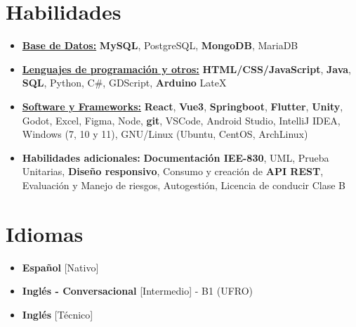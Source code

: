 \documentclass[11pt,a4paper,sans]{moderncv}
\newcommand{\sectionMargin}{-3mm}
\begin{document}
\section{Habilidades}{
    \begin{itemize}[label=\textbullet]
        \item {\underline{\textbf{Base de Datos:}}
            \textbf{MySQL},
            PostgreSQL,
            \textbf{MongoDB},
            MariaDB
        }
        \item {\underline{\textbf{Lenguajes de programación y otros:}}
            \textbf{HTML/CSS/JavaScript},
            \textbf{Java},
            \textbf{SQL},
            Python,
            C\#,
            GDScript,
            \textbf{Arduino}
            LateX
        }
        \item {\underline{\textbf{Software y Frameworks:}}
            \textbf{React},
            \textbf{Vue3},
            \textbf{Springboot},
            \textbf{Flutter},
            \textbf{Unity},
            Godot,
            Excel, 
            Figma,
            Node,
            \textbf{git},
            VSCode,
            Android Studio,
            IntelliJ IDEA,
            Windows (7, 10 y 11),
            GNU/Linux (Ubuntu, CentOS, ArchLinux)
        }
        \item {\textbf{Habilidades adicionales:} 
            \textbf{Documentación IEE-830},
            UML,
            Prueba Unitarias,
            \textbf{Diseño responsivo},
            Consumo y creación de \textbf{API REST},
            Evaluación y Manejo de riesgos,  
            Autogestión, 
            Licencia de conducir Clase B
        }
    \end{itemize}
}

\vspace*{\sectionMargin}

\section{Idiomas}{
    \begin{multicols}{2}
        \begin{itemize}[label=\textbullet]
        \item \textbf{Español} [Nativo]
        \item \textbf{Inglés - Conversacional} [Intermedio] - B1 (UFRO)
        \item \textbf{Inglés} [Técnico]
        \end{itemize}
    \end{multicols}
}
\end{document}
